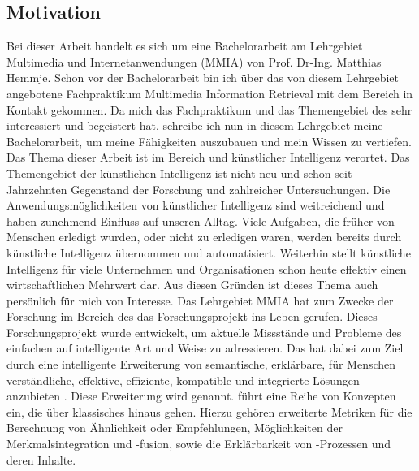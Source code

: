 \subsection{Motivation}
\label{sec1:intro:subsec:motivation}
Bei dieser Arbeit handelt es sich um eine Bachelorarbeit am Lehrgebiet Multimedia und Internetanwendungen (MMIA) von Prof. Dr-Ing. Matthias Hemmje. 
Schon vor der Bachelorarbeit bin ich über das von diesem Lehrgebiet angebotene Fachpraktikum Multimedia Information Retrieval mit dem Bereich \mmir{} in Kontakt gekommen. 
Da mich das Fachpraktikum und das Themengebiet des \mmir{} sehr interessiert und begeistert hat, schreibe ich nun in diesem Lehrgebiet meine Bachelorarbeit, um meine Fähigkeiten auszubauen und mein Wissen zu vertiefen.
\med
Das Thema dieser Arbeit ist im Bereich \mmir{} und künstlicher Intelligenz verortet. 
Das Themengebiet der künstlichen Intelligenz ist nicht neu und schon seit Jahrzehnten Gegenstand der Forschung und zahlreicher Untersuchungen. 
Die Anwendungsmöglichkeiten von künstlicher Intelligenz sind weitreichend und haben zunehmend Einfluss auf unseren Alltag. 
Viele Aufgaben, die früher von Menschen erledigt wurden, oder nicht zu erledigen waren, werden bereits durch künstliche Intelligenz übernommen und automatisiert. 
Weiterhin stellt künstliche Intelligenz für viele Unternehmen und Organisationen schon heute effektiv einen wirtschaftlichen Mehrwert dar. 
Aus diesen Gründen ist dieses Thema auch persönlich für mich von Interesse.
\med
Das Lehrgebiet MMIA hat zum Zwecke der Forschung im Bereich des \mmir{} das Forschungsprojekt \gmafi{} ins Leben gerufen. 
Dieses Forschungsprojekt wurde entwickelt, um aktuelle Missstände und Probleme des einfachen \mmir{} auf intelligente Art und Weise zu adressieren. 
Das \gmaf{} hat dabei zum Ziel durch eine intelligente Erweiterung von \mmir{} semantische, erklärbare, für Menschen verständliche, effektive, effiziente, kompatible und integrierte Lösungen anzubieten \cite[S.~20]{swa_diss}. 
Diese Erweiterung wird \smmiri{} genannt. 
\smmir{} führt eine Reihe von Konzepten ein, die über klassisches \mmir{} hinaus gehen. 
Hierzu gehören erweiterte Metriken für die Berechnung von Ähnlichkeit oder Empfehlungen, Möglichkeiten der Merkmalsintegration und -fusion, sowie die Erklärbarkeit von \mmir{}-Prozessen und deren Inhalte.
\par
